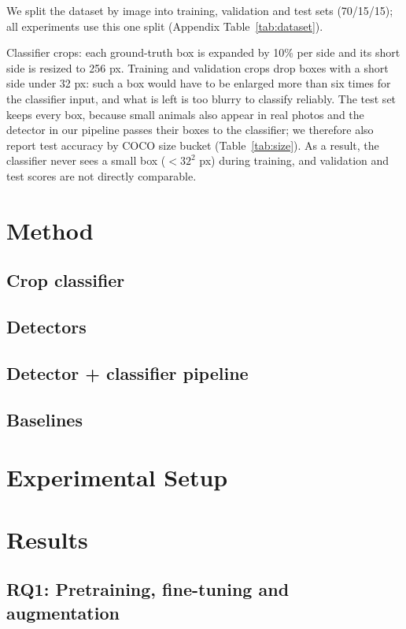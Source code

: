 \documentclass[11pt]{article}
\begin{document}
We split the dataset by image into training, validation and test sets (70/15/15); all experiments use this one
split (Appendix Table~\ref{tab:dataset}).

Classifier crops: each ground-truth box is expanded by 10\% per side and its short side is resized to 256 px.
Training and validation crops drop boxes with a short side under 32 px: such a box would have to be enlarged more
than six times for the classifier input, and what is left is too blurry to classify reliably. The test set keeps
every box, because small animals also appear in real photos and the detector in our pipeline passes their boxes to
the classifier; we therefore also report test accuracy by COCO size bucket (Table~\ref{tab:size}). As a result, the
classifier never sees a small box ($<32^2$ px) during training, and validation and test scores are not directly
comparable.


\section{Method}
\label{sec:method}

\subsection{Crop classifier}

\subsection{Detectors}

\subsection{Detector + classifier pipeline}

\subsection{Baselines}

\section{Experimental Setup}
\label{sec:setup}

\section{Results}
\label{sec:results}

\subsection{RQ1: Pretraining, fine-tuning and augmentation}
\end{document}
